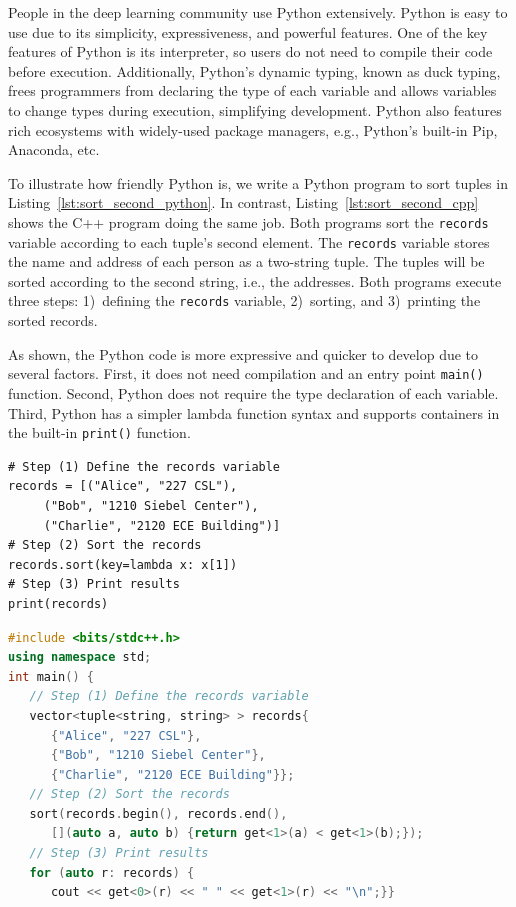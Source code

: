 People in the deep learning community use Python extensively. Python is easy to use due to its simplicity, expressiveness, and powerful features. One of the key features of Python is its interpreter, so users do not need to compile their code before execution. Additionally, Python's dynamic typing, known as duck typing, frees programmers from declaring the type of each variable and allows variables to change types during execution, simplifying development. Python also features rich ecosystems with widely-used package managers, e.g., Python's built-in Pip, Anaconda, etc.

To illustrate how friendly Python is, we write a Python program to sort tuples in Listing~\ref{lst:sort_second_python}. In contrast, Listing~\ref{lst:sort_second_cpp} shows the C++ program doing the same job. Both programs sort the \texttt{records} variable according to each tuple's second element. The \texttt{records} variable stores the name and address of each person as a two-string tuple. The tuples will be sorted according to the second string, i.e., the addresses. Both programs execute three steps: 1)~defining the \texttt{records} variable, 2)~sorting, and 3)~printing the sorted records.


As shown, the Python code is more expressive and quicker to develop due to several factors. First, it does not need compilation and an entry point \texttt{main()} function. Second, Python does not require the type declaration of each variable. Third, Python has a simpler lambda function syntax and supports containers in the built-in \texttt{print()} function.


\begin{lstlisting}[float,caption={Python code to sort tuples according to their second elements.},label={lst:sort_second_python}]
# Step (1) Define the records variable
records = [("Alice", "227 CSL"), 
     ("Bob", "1210 Siebel Center"),
     ("Charlie", "2120 ECE Building")]
# Step (2) Sort the records
records.sort(key=lambda x: x[1])
# Step (3) Print results
print(records)
\end{lstlisting}

\begin{lstlisting}[float,language=C++,caption={C++ code to sort tuples by their second elements~\cite{geeksforgeeksSortingVectorTuple2020}.},label={lst:sort_second_cpp}]
#include <bits/stdc++.h>
using namespace std;
int main() {
   // Step (1) Define the records variable
   vector<tuple<string, string> > records{ 
      {"Alice", "227 CSL"}, 
      {"Bob", "1210 Siebel Center"},
      {"Charlie", "2120 ECE Building"}};
   // Step (2) Sort the records
   sort(records.begin(), records.end(), 
      [](auto a, auto b) {return get<1>(a) < get<1>(b);});
   // Step (3) Print results
   for (auto r: records) {
      cout << get<0>(r) << " " << get<1>(r) << "\n";}}
\end{lstlisting}


